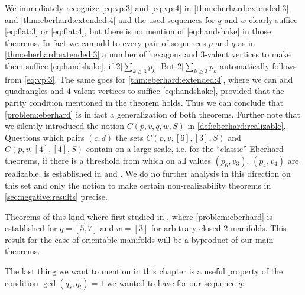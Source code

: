\begin{remark}
  We immediately recognize \eqref{eq:vp:3} and \eqref{eq:vp:4} in \autoref{thm:eberhard:extended:3} and \autoref{thm:eberhard:extended:4} and the used sequences for $q$ and $w$ clearly suffice \eqref{eq:flat:3} or \eqref{eq:flat:4}, but there is no mention of \eqref{eq:handshake} in those theorems. In fact we can add to every pair of sequences $p$ and $q$ as in \autoref{thm:eberhard:extended:3} a number of hexagons and $3$-valent vertices to make them suffice \eqref{eq:handshake}, if $2 | \sum_{k \geq 3} p_k$. But $2 | \sum_{k \geq 3} p_k$ automatically follows from \eqref{eq:vp:3}. The same goes for \autoref{thm:eberhard:extended:4}, where we can add quadrangles and $4$-valent vertices to suffice \eqref{eq:handshake}, provided that the parity condition mentioned in the theorem holds. Thus we can conclude that \autoref{problem:eberhard} is in fact a generalization of both theorems. Further note that we silently introduced the notion $C(p, v, q, w, S)$ in \autoref{def:eberhard:realizable}. Questions which pairs $(c, d)$ the sets $C(p, v, [6], [3], S)$ and $C(p, v, [4], [4], S)$ contain on a large scale, i.e. for the ``classic'' {\sc Eberhard} theorems, if there is a threshold from which on all values $(p_6, v_3)$, $(p_4, v_4)$ are realizable, is established in \cite{jendrol1993face} and \cite{trenkler1984convex}. We do no further analysis in this direction on this set and only the notion to make certain non-realizability theorems in \autoref{sec:negative:results} precise.
\end{remark}

Theorems of this kind where first studied in \cite{devos2010eberhard}, where \autoref{problem:eberhard} is established for $q = [5, 7]$ and $w = [3]$ for arbitrary closed $2$-manifolds. This result for the case of orientable manifolds will be  a byproduct of our main theorems.

The last thing we want to mention in this chapter is a useful property of the condition $\gcd(q_s, q_l) = 1$ we wanted to have for our sequence $q$:

